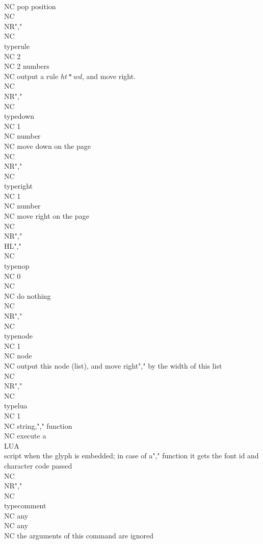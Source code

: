   \\NC pop position \\NC \\NR","\\NC \\type{rule}      \\NC 2         \\NC 2 numbers \\NC output a rule $ht*wd$, and move right. \\NC \\NR","\\NC \\type{down}      \\NC 1         \\NC number    \\NC move down on the page \\NC \\NR","\\NC \\type{right}     \\NC 1         \\NC number    \\NC move right on the page \\NC \\NR","\\HL","\\NC \\type{nop}       \\NC 0         \\NC           \\NC do nothing \\NC \\NR","\\NC \\type{node}      \\NC 1         \\NC node      \\NC output this node (list), and move right","                                                     by the width of this list\\NC \\NR","\\NC \\type{lua}       \\NC 1         \\NC string,","                                       function  \\NC execute a \\LUA\\ script when the glyph is embedded; in case of a","                                                     function it gets the font id and character code passed \\NC \\NR","\\NC \\type{comment}   \\NC any       \\NC any       \\NC the arguments of this command are ignored 
